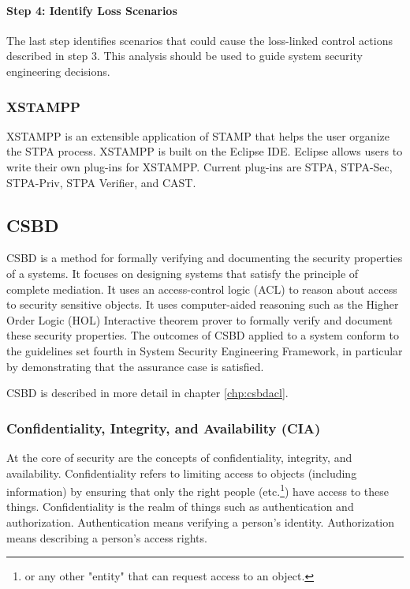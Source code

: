 \documentclass[../../main/main.tex]{subfiles}
\begin{document}
\paragraph*{Step 4: Identify Loss Scenarios}
The last step identifies scenarios that could cause the loss-linked control actions described in step 3.  This analysis should be used to guide system security engineering decisions.


\subsubsection{XSTAMPP}\label{sssec:xstamp}
XSTAMPP is an extensible application of STAMP that helps the user organize the STPA process.  XSTAMPP is built on the Eclipse IDE.  Eclipse allows users to write their own plug-ins for XSTAMPP.  Current plug-ins are STPA, STPA-Sec, STPA-Priv, STPA Verifier, and CAST.  



\subsection{CSBD}\label{ssec:csbd}
CSBD is a method for formally verifying and documenting the security properties of a systems.  It focuses on designing systems that satisfy the principle of complete mediation.  It uses an access-control logic (ACL) to reason about access to security sensitive objects.  It uses computer-aided reasoning such as the Higher Order Logic (HOL) Interactive theorem prover to formally verify and document these security properties.  The outcomes of CSBD applied to a system conform to the guidelines set fourth in System Security Engineering Framework, in particular by demonstrating that the assurance case is satisfied.

CSBD is described in more detail in chapter \ref{chp:csbdacl}.

\subsubsection{Confidentiality, Integrity, and Availability (CIA) }\label{sssect:ssmts}
At the core of security are the concepts of confidentiality, integrity, and availability.  Confidentiality refers to limiting access to objects (including information) by ensuring that only the right people (etc.\footnote{or any other "entity" that can request access to an object.}) have access to these things.  Confidentiality is the realm of things such as authentication and authorization.  Authentication means verifying a person's identity.  Authorization means describing a person's access rights. 
\end{document}
